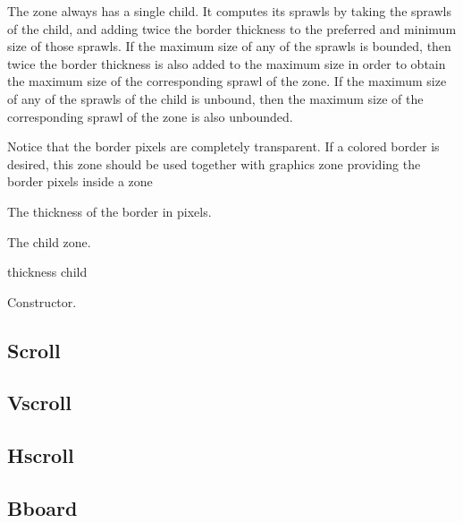 The  zone always has a single child.  It computes its
sprawls by taking the sprawls of the child, and adding twice the border
thickness to the preferred and minimum size of those sprawls.  If the
maximum size of any of the sprawls is bounded, then twice the border
thickness is also added to the maximum size in order to obtain the
maximum size of the corresponding sprawl of the  zone.
If the maximum size of any of the sprawls of the child is unbound,
then the maximum size of the corresponding sprawl of the 
zone is also unbounded.

Notice that the border pixels are completely transparent.  If a
colored border is desired, this zone should be used together with
graphics zone providing the border pixels inside a  zone



The thickness of the border in pixels.  


The child zone.

 {thickness child}

Constructor.

\subsection{Scroll}



\subsection{Vscroll}



\subsection{Hscroll}



\subsection{Bboard}


